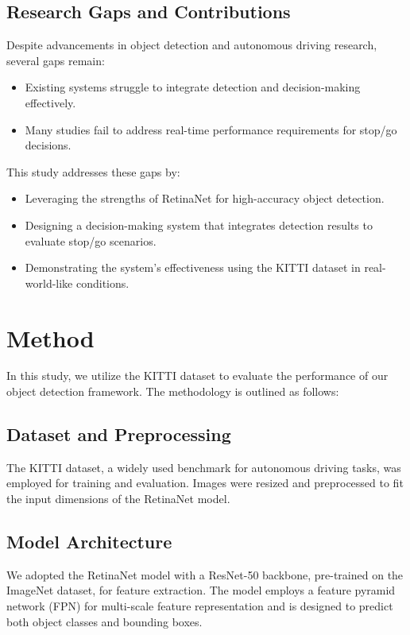 \documentclass[10pt,twocolumn,letterpaper]{article}
\begin{document}
\subsection{Research Gaps and Contributions}
Despite advancements in object detection and autonomous driving research, several gaps remain:
\begin{itemize}
    \item Existing systems struggle to integrate detection and decision-making effectively.
    \item Many studies fail to address real-time performance requirements for stop/go decisions.
\end{itemize}
This study addresses these gaps by:
\begin{itemize}
    \item Leveraging the strengths of RetinaNet for high-accuracy object detection.
    \item Designing a decision-making system that integrates detection results to evaluate stop/go scenarios.
    \item Demonstrating the system's effectiveness using the KITTI dataset in real-world-like conditions.
\end{itemize}

\section{Method}

In this study, we utilize the KITTI dataset to evaluate the performance of our object detection framework. The methodology is outlined as follows:

\subsection{Dataset and Preprocessing}
The KITTI dataset, a widely used benchmark for autonomous driving tasks, was employed for training and evaluation. Images were resized and preprocessed to fit the input dimensions of the RetinaNet model.

\subsection{Model Architecture}
We adopted the RetinaNet model with a ResNet-50 backbone, pre-trained on the ImageNet dataset, for feature extraction. The model employs a feature pyramid network (FPN) for multi-scale feature representation and is designed to predict both object classes and bounding boxes.
\end{document}
